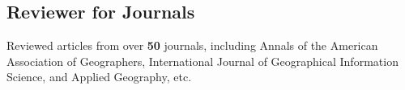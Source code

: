 \documentclass[11pt, a4paper]{article}
\begin{document}
\subsection*{Reviewer for Journals}
Reviewed articles from over \textbf{50} journals, including Annals of the American Association of Geographers, International Journal of Geographical Information Science, and Applied Geography, etc.
\end{document}
